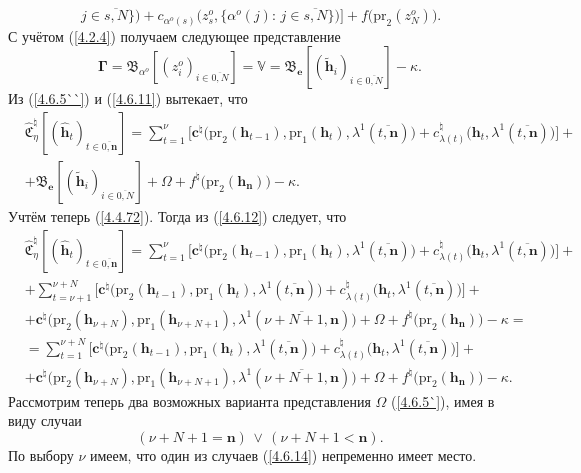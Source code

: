 \documentclass[12pt]{report}
\newcommand{\bfn}{\begin{equation}}
\newcommand{\efn}{\end{equation}}
\newcommand{\ov}{\overline}
\newcommand{\Om}{\Omega}
\newcommand{\la}{\lambda}
\newcommand{\al}{\alpha}
\newcommand{\zc}{{\mathbf c}}
\newcommand{\nn}{{\mathbf n}}
\begin{document}
{{$$\,j\in\ov{s,N}\}\bigl)+ c_{\al^o(s)}\bigl(z_s^o,\{\al^o(j):\,j\in\ov{s,N}\}\bigl)\bigl]
+f\bigl(\mathrm{pr}_2(z_N^o)\bigl).
$$
С учётом (\ref{4.2.4}) получаем следующее представление
\bfn\label{4.6.11}
\mathbf{\Gamma}= \mathfrak{B}_{\al^o}[(z_i^o)_{i\in\ov{0,N}}] =\mathbb{V}=
\mathfrak{B}_\mathbf{e}[(\tilde{\mathbf{h}}_i)_{i\in\ov{0,N}}] - \kappa.
\efn
Из (\ref{4.6.5``}) и (\ref{4.6.11}) вытекает, что
\begin{eqnarray}
&\widehat{\mathfrak{C}}_\eta^\natural[(\hat{\mathbf{h}}_t)_{t\in\ov{0,\nn}}]=
\sum\limits_{t=1}^\nu\bigl[\zc^\natural\bigl(\mathrm{pr}_2(\mathbf{h}_{t-1}),
\mathrm{pr}_1(\mathbf{h}_t),
\la^1(\ov{t,\nn})\bigl) + c_{\la(t)}^\natural\bigl(\mathbf{h}_t,\la^1(\ov{t,\nn})\bigl)\bigl] +
&\nonumber\\
&+ \mathfrak{B}_\mathbf{e}
[(\tilde{\mathbf{h}}_i)_{i\in\ov{0,N}}] + \Om +
f^\natural\bigl(\mathrm{pr}_2(\mathbf{h}_\nn)\bigl) -\kappa.
&\label{4.6.12}
\end{eqnarray}
Учтём теперь (\ref{4.4.72}). Тогда из (\ref{4.6.12}) следует, что
\begin{eqnarray}
&\widehat{\mathfrak{C}}_\eta^\natural[(\hat{\mathbf{h}}_t)_{t\in\ov{0,\nn}}]=
\sum\limits_{t=1}^\nu\bigl[\zc^\natural\bigl(\mathrm{pr}_2(\mathbf{h}_{t-1}),\mathrm{pr}_1(\mathbf{h}_t),
 \la^1(\ov{t,\nn})\bigl) + c_{\la(t)}^\natural\bigl(\mathbf{h}_t,\la^1(\ov{t,\nn})\bigl)\bigl] +
&\nonumber\\
&+\sum\limits_{t=\nu+1}^{\nu+N}\bigl[\zc^\natural\bigl(\mathrm{pr}_2(\mathbf{h}_{t-1}),\mathrm{pr}_1
(\mathbf{h}_t),\la^1(\ov{t,\nn})\bigl)+ c_{\la(t)}^\natural\bigl(\mathbf{h}_t,\la^1(\ov{t,\nn})\bigl)\bigl] +
&\nonumber\\
&+ \zc^\natural\bigl(\mathrm{pr}_2(\mathbf{h}_{\nu+N}),\mathrm{pr}_1(\mathbf{h}_{\nu+N+1}),
\la^1(\ov{\nu+N+1,\nn})\bigl)+ \Om + f^\natural\bigl(\mathrm{pr}_2(\mathbf{h}_\nn)\bigl) -\kappa =
&\nonumber\\
&= \sum\limits_{t=1}^{\nu+N}\bigl[\zc^\natural\bigl(\mathrm{pr}_2(\mathbf{h}_{t-1}),\mathrm{pr}_1
(\mathbf{h}_t),\la^1(\ov{t,\nn})\bigl)+ c_{\la(t)}^\natural\bigl(\mathbf{h}_t,\la^1(\ov{t,\nn})\bigl)\bigl] +
&\nonumber\\
&+ \zc^\natural\bigl(\mathrm{pr}_2(\mathbf{h}_{\nu+N}),\mathrm{pr}_1(\mathbf{h}_{\nu+N+1}),
\la^1(\ov{\nu+N+1,\nn})\bigl)+ \Om + f^\natural\bigl(\mathrm{pr}_2(\mathbf{h}_\nn)\bigl) -\kappa.
&\label{4.6.13}
\end{eqnarray}
 Рассмотрим теперь два возможных варианта представления $\Om$ (\ref{4.6.5`}), имея в виду случаи
 \bfn\label{4.6.14}(\nu+N+1 = \nn)\,\vee\,(\nu+N+ 1< \nn).
 \efn
 По выбору $\nu$ имеем, что один из случаев (\ref{4.6.14}) непременно имеет место.

}}
\end{document}
